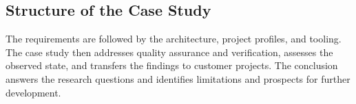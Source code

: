 \subsection{Structure of the Case Study}
\label{subsec:aufbau-der-fallstudie}

The requirements are followed by the architecture, project profiles, and
tooling. The case study then addresses quality assurance and verification,
assesses the observed state, and transfers the findings to customer projects.
The conclusion answers the research questions and identifies limitations and
prospects for further development.
